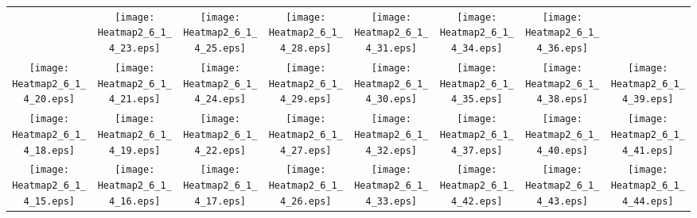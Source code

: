 \documentclass{standalone}
\begin{document}
\renewcommand{\arraystretch}{0}
\setlength{\tabcolsep}{0pt}
\begin{tabular}{ *8{c} }
 & \texttt{[image: Heatmap2\_6\_1\_4\_23.eps]} & \texttt{[image: Heatmap2\_6\_1\_4\_25.eps]} & \texttt{[image: Heatmap2\_6\_1\_4\_28.eps]} & \texttt{[image: Heatmap2\_6\_1\_4\_31.eps]} & \texttt{[image: Heatmap2\_6\_1\_4\_34.eps]} & \texttt{[image: Heatmap2\_6\_1\_4\_36.eps]} &  \\
\texttt{[image: Heatmap2\_6\_1\_4\_20.eps]} & \texttt{[image: Heatmap2\_6\_1\_4\_21.eps]} & \texttt{[image: Heatmap2\_6\_1\_4\_24.eps]} & \texttt{[image: Heatmap2\_6\_1\_4\_29.eps]} & \texttt{[image: Heatmap2\_6\_1\_4\_30.eps]} & \texttt{[image: Heatmap2\_6\_1\_4\_35.eps]} & \texttt{[image: Heatmap2\_6\_1\_4\_38.eps]} & \texttt{[image: Heatmap2\_6\_1\_4\_39.eps]} \\
\texttt{[image: Heatmap2\_6\_1\_4\_18.eps]} & \texttt{[image: Heatmap2\_6\_1\_4\_19.eps]} & \texttt{[image: Heatmap2\_6\_1\_4\_22.eps]} & \texttt{[image: Heatmap2\_6\_1\_4\_27.eps]} & \texttt{[image: Heatmap2\_6\_1\_4\_32.eps]} & \texttt{[image: Heatmap2\_6\_1\_4\_37.eps]} & \texttt{[image: Heatmap2\_6\_1\_4\_40.eps]} & \texttt{[image: Heatmap2\_6\_1\_4\_41.eps]} \\
\texttt{[image: Heatmap2\_6\_1\_4\_15.eps]} & \texttt{[image: Heatmap2\_6\_1\_4\_16.eps]} & \texttt{[image: Heatmap2\_6\_1\_4\_17.eps]} & \texttt{[image: Heatmap2\_6\_1\_4\_26.eps]} & \texttt{[image: Heatmap2\_6\_1\_4\_33.eps]} & \texttt{[image: Heatmap2\_6\_1\_4\_42.eps]} & \texttt{[image: Heatmap2\_6\_1\_4\_43.eps]} & \texttt{[image: Heatmap2\_6\_1\_4\_44.eps]} \\

\end{tabular}
\end{document}
